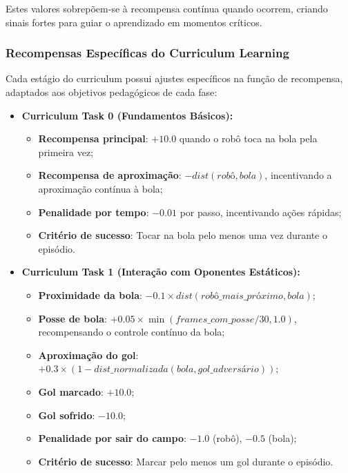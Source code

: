 Estes valores sobrepõem-se à recompensa contínua quando ocorrem, criando sinais fortes para guiar o aprendizado em momentos críticos.

\subsubsection{Recompensas Específicas do Curriculum Learning}

Cada estágio do curriculum possui ajustes específicos na função de recompensa, adaptados aos objetivos pedagógicos de cada fase:

\begin{itemize}
    \item \textbf{Curriculum Task 0 (Fundamentos Básicos):}
    \begin{itemize}
        \item \textbf{Recompensa principal}: $+10.0$ quando o robô toca na bola pela primeira vez;
        \item \textbf{Recompensa de aproximação}: $-dist(robô, bola)$, incentivando a aproximação contínua à bola;
        \item \textbf{Penalidade por tempo}: $-0.01$ por passo, incentivando ações rápidas;
        \item \textbf{Critério de sucesso}: Tocar na bola pelo menos uma vez durante o episódio.
    \end{itemize}
    
    \item \textbf{Curriculum Task 1 (Interação com Oponentes Estáticos):}
    \begin{itemize}
        \item \textbf{Proximidade da bola}: $-0.1 \times dist(robô\_mais\_próximo, bola)$;  
        \item \textbf{Posse de bola}: $+0.05 \times \min(frames\_com\_posse / 30, 1.0)$, recompensando o controle contínuo da bola;
        \item \textbf{Aproximação do gol}: $+0.3 \times (1 - dist\_normalizada(bola, gol\_adversário))$;
        \item \textbf{Gol marcado}: $+10.0$;
        \item \textbf{Gol sofrido}: $-10.0$;
        \item \textbf{Penalidade por sair do campo}: $-1.0$ (robô), $-0.5$ (bola);
        \item \textbf{Critério de sucesso}: Marcar pelo menos um gol durante o episódio.
    \end{itemize}
\end{itemize}

